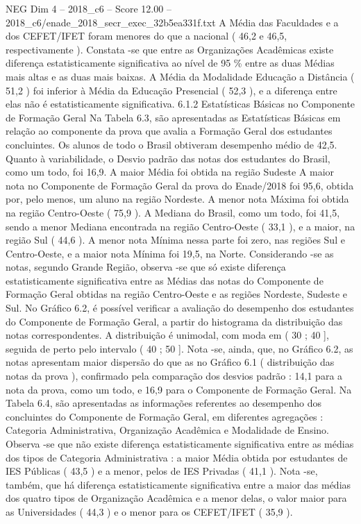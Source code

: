 \begin{textsample}{NEG Dim 4 – 2018\_c6 – Score 12.00 – 2018\_c6/enade\_2018\_secr\_exec\_32b5ea331f.txt}
A Média das Faculdades e a dos CEFET/IFET foram menores do que a nacional ( 46,2 e 46,5, respectivamente ).
Constata -se que entre as Organizações Acadêmicas existe diferença estatisticamente significativa ao nível de 95 \% entre as duas Médias mais altas e as duas mais baixas.
A Média da Modalidade Educação a Distância ( 51,2 ) foi inferior à Média da Educação Presencial ( 52,3 ), e a diferença entre elas não é estatisticamente significativa. 6.1.2 Estatísticas Básicas no Componente de Formação Geral Na Tabela 6.3, são apresentadas as Estatísticas Básicas em relação ao componente da prova que avalia a Formação Geral dos estudantes concluintes.
Os alunos de todo o Brasil obtiveram desempenho médio de 42,5.
Quanto à variabilidade, o Desvio padrão das notas dos estudantes do Brasil, como um todo, foi 16,9.
A maior Média foi obtida na região Sudeste A maior nota no Componente de Formação Geral da prova do Enade/2018 foi 95,6, obtida por, pelo menos, um aluno na região Nordeste.
A menor nota Máxima foi obtida na região Centro-Oeste ( 75,9 ).
A Mediana do Brasil, como um todo, foi 41,5, sendo a menor Mediana encontrada na região Centro-Oeste ( 33,1 ), e a maior, na região Sul ( 44,6 ).
A menor nota Mínima nessa parte foi zero, nas regiões Sul e Centro-Oeste, e a maior nota Mínima foi 19,5, na Norte.
Considerando -se as notas, segundo Grande Região, observa -se que só existe diferença estatisticamente significativa entre as Médias das notas do Componente de Formação Geral obtidas na região Centro-Oeste e as regiões Nordeste, Sudeste e Sul.
No Gráfico 6.2, é possível verificar a avaliação do desempenho dos estudantes do Componente de Formação Geral, a partir do histograma da distribuição das notas correspondentes.
A distribuição é unimodal, com moda em ( 30 ; 40 ], seguida de perto pelo intervalo ( 40 ; 50 ].
Nota -se, ainda, que, no Gráfico 6.2, as notas apresentam maior dispersão do que as no Gráfico 6.1 ( distribuição das notas da prova ), confirmado pela comparação dos desvios padrão : 14,1 para a nota da prova, como um todo, e 16,9 para o Componente de Formação Geral.
Na Tabela 6.4, são apresentadas as informações referentes ao desempenho dos concluintes do Componente de Formação Geral, em diferentes agregações : Categoria Administrativa, Organização Acadêmica e Modalidade de Ensino.
Observa -se que não existe diferença estatisticamente significativa entre as médias dos tipos de Categoria Administrativa : a maior Média obtida por estudantes de IES Públicas ( 43,5 ) e a menor, pelos de IES Privadas ( 41,1 ).
Nota -se, também, que há diferença estatisticamente significativa entre a maior das médias dos quatro tipos de Organização Acadêmica e a menor delas, o valor maior para as Universidades ( 44,3 ) e o menor para os CEFET/IFET ( 35,9 ).

\end{textsample}
